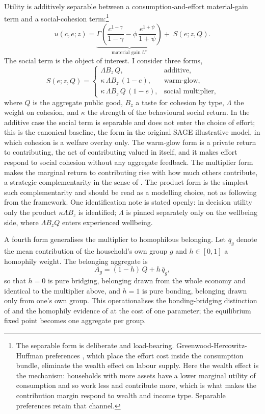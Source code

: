 \documentclass[11pt]{article}
\begin{document}
Utility is additively separable between a consumption-and-effort material-gain term and a social-cohesion term:\footnote{The separable form is deliberate and load-bearing. Greenwood-Hercowitz-Huffman preferences \citep{ghh1988}, which place the effort cost inside the consumption bundle, eliminate the wealth effect on labour supply. Here the wealth effect is the mechanism: households with more assets have a lower marginal utility of consumption and so work less and contribute more, which is what makes the contribution margin respond to wealth and income type. Separable preferences retain that channel.}
\begin{equation}
u(c,e;z) = \underbrace{\Gamma\left(\frac{c^{1-\gamma}}{1-\gamma} - \phi\,\frac{e^{1+\psi}}{1+\psi}\right)}_{\text{material gain } U^c} + \; S(e;z,Q).
\end{equation}
The social term is the object of interest. I consider three forms,
\begin{equation}
S(e;z,Q) =
\begin{cases}
\Lambda B_z\, Q, & \text{additive,} \\
\kappa\,\Lambda B_z\,(1-e), & \text{warm-glow,} \\
\kappa\,\Lambda B_z\,Q\,(1-e), & \text{social multiplier,}
\end{cases}
\end{equation}
where $Q$ is the aggregate public good, $B_z$ a taste for cohesion by type, $\Lambda$ the weight on cohesion, and $\kappa$ the strength of the behavioural social return. In the additive case the social term is separable and does not enter the choice of effort; this is the canonical baseline, the form in the original SAGE illustrative model, in which cohesion is a welfare overlay only. The warm-glow form is a private return to contributing, the act of contributing valued in itself, and it makes effort respond to social cohesion without any aggregate feedback. The multiplier form makes the marginal return to contributing rise with how much others contribute, a strategic complementarity in the sense of \citet{glaeser2003}. The product form is the simplest such complementarity and should be read as a modelling choice, not as following from the framework. One identification note is stated openly: in decision utility only the product $\kappa \Lambda B_z$ is identified; $\Lambda$ is pinned separately only on the wellbeing side, where $\Lambda B_z Q$ enters experienced wellbeing.

A fourth form generalises the multiplier to homophilous belonging. Let $\bar{q}_g$ denote the mean contribution of the household's own group $g$ and $h \in [0,1]$ a homophily weight. The belonging aggregate is
\begin{equation}
A_g = (1-h)\,Q + h\,\bar{q}_g,
\end{equation}
so that $h = 0$ is pure bridging, belonging drawn from the whole economy and identical to the multiplier above, and $h = 1$ is pure bonding, belonging drawn only from one's own group. This operationalises the bonding-bridging distinction of \citet{putnam2000} and the homophily evidence of \citet{mcpherson2001} at the cost of one parameter; the equilibrium fixed point becomes one aggregate per group.
\end{document}
